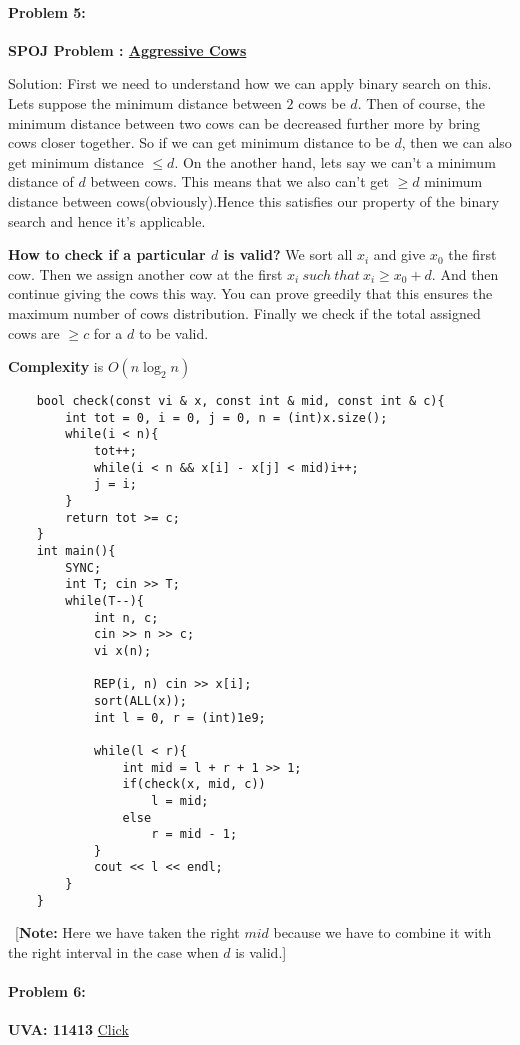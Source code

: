 \documentclass[12pt]{article}
\begin{document}
\begin{large}
\paragraph{\large Problem 5:}\textbf{SPOJ Problem : \href{http://www.spoj.com/problems/AGGRCOW/}{Aggressive Cows}}

Solution: First we need to understand how we can apply binary search on this. Lets suppose the minimum distance between $2$ cows be $d$. Then of course, the minimum distance between two cows can be decreased further more by bring cows closer together. So if we can get minimum distance to be $d$, then we can also get minimum distance $\leq d$. On the another hand, lets say we can't a minimum distance of $d$ between cows. This means that we also can't get $\geq d$ minimum distance between cows(obviously).Hence this satisfies our property of the binary search and hence it's applicable.

\textbf{How to check if a particular $d$ is valid?} We sort all $x_i$ and give $x_0$ the first cow. Then we assign another cow at the first $x_i\ such\ that\ x_i \geq x_0 + d$. And then continue giving the cows this way. You can prove greedily that this ensures the maximum number of cows distribution. 
Finally we check if the total assigned cows are $\geq c$ for a $d$ to be valid.

\textbf{Complexity} is $O(n\log_2 {n})$
\begin{verbatim} 
    bool check(const vi & x, const int & mid, const int & c){
    	int tot = 0, i = 0, j = 0, n = (int)x.size();
    	while(i < n){
    		tot++; 
    		while(i < n && x[i] - x[j] < mid)i++; 
    		j = i; 
    	}
    	return tot >= c; 
    }  
    int main(){
    	SYNC; 
    	int T; cin >> T; 
    	while(T--){
    		int n, c; 
    		cin >> n >> c; 
    		vi x(n); 
     
    		REP(i, n) cin >> x[i];
    		sort(ALL(x)); 
    		int l = 0, r = (int)1e9; 	
    		
    		while(l < r){
    			int mid = l + r + 1 >> 1;
    			if(check(x, mid, c))
    				l = mid; 
    			else 
    				r = mid - 1; 
    		}
    		cout << l << endl; 
    	}
    } 
\end{verbatim}
\ [\textbf{Note:} Here we have taken the right $mid$ because we have to combine it with the right interval in the case when $d$ is valid.]

\paragraph{\large Problem 6:}\textbf{UVA: 11413} \href{https://uva.onlinejudge.org/external/114/11413.pdf}{Click}


\end{large}
\end{document}
